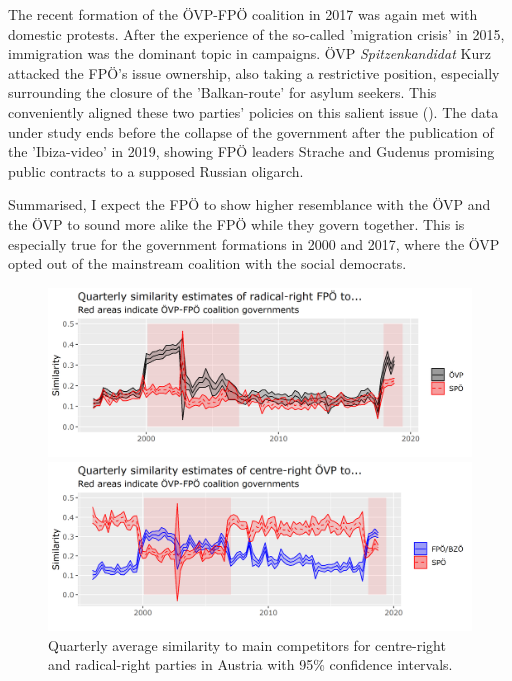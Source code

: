 \documentclass{article}
\begin{document}
The recent formation of the ÖVP-FPÖ coalition in 2017 was again met with domestic protests. After the experience of the so-called 'migration crisis' in 2015, immigration was the dominant topic in campaigns. ÖVP \textit{Spitzenkandidat} Kurz attacked the FPÖ's issue ownership, also taking  a restrictive position, especially surrounding the closure of the 'Balkan-route' for asylum seekers. This conveniently aligned these two parties' policies on this salient issue (\cite{Bodlos2018}). The data under study ends before the collapse of the government after the publication of the 'Ibiza-video' in 2019, showing FPÖ leaders Strache and Gudenus promising public contracts to a supposed Russian oligarch.\par 

Summarised, I expect the FPÖ to show higher resemblance with the ÖVP and the ÖVP to sound more alike the FPÖ while they govern together. This is especially true for the government formations in 2000 and 2017, where the ÖVP opted out of the mainstream coalition with the social democrats. \par

\begin{figure}
\begin{minipage}{\textwidth}
\includegraphics[width=\linewidth]{AT/vis/AT_fp_paper.png}
\end{minipage}
\hfill
\begin{minipage}{\textwidth}
\includegraphics[width=\linewidth]{AT/vis/AT_vp_paper.png}
\end{minipage}
\caption{Quarterly average similarity to main competitors for centre-right and radical-right parties in Austria with 95\% confidence intervals.}
\label{fig:govs}
\end{figure}
\end{document}
